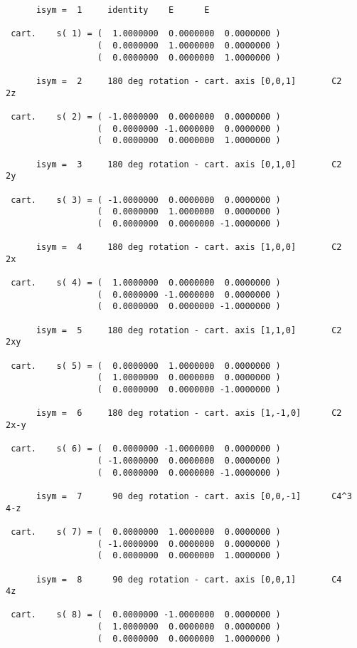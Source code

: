 \documentclass[12pt,a4paper]{article}
\begin{document}
\begin{footnotesize}
\begin{verbatim}
      isym =  1     identity    E      E

 cart.    s( 1) = (  1.0000000  0.0000000  0.0000000 )
                  (  0.0000000  1.0000000  0.0000000 )
                  (  0.0000000  0.0000000  1.0000000 )

      isym =  2     180 deg rotation - cart. axis [0,0,1]       C2    2z

 cart.    s( 2) = ( -1.0000000  0.0000000  0.0000000 )
                  (  0.0000000 -1.0000000  0.0000000 )
                  (  0.0000000  0.0000000  1.0000000 )

      isym =  3     180 deg rotation - cart. axis [0,1,0]       C2    2y

 cart.    s( 3) = ( -1.0000000  0.0000000  0.0000000 )
                  (  0.0000000  1.0000000  0.0000000 )
                  (  0.0000000  0.0000000 -1.0000000 )

      isym =  4     180 deg rotation - cart. axis [1,0,0]       C2    2x

 cart.    s( 4) = (  1.0000000  0.0000000  0.0000000 )
                  (  0.0000000 -1.0000000  0.0000000 )
                  (  0.0000000  0.0000000 -1.0000000 )

      isym =  5     180 deg rotation - cart. axis [1,1,0]       C2    2xy

 cart.    s( 5) = (  0.0000000  1.0000000  0.0000000 )
                  (  1.0000000  0.0000000  0.0000000 )
                  (  0.0000000  0.0000000 -1.0000000 )

      isym =  6     180 deg rotation - cart. axis [1,-1,0]      C2    2x-y

 cart.    s( 6) = (  0.0000000 -1.0000000  0.0000000 )
                  ( -1.0000000  0.0000000  0.0000000 )
                  (  0.0000000  0.0000000 -1.0000000 )

      isym =  7      90 deg rotation - cart. axis [0,0,-1]      C4^3  4-z

 cart.    s( 7) = (  0.0000000  1.0000000  0.0000000 )
                  ( -1.0000000  0.0000000  0.0000000 )
                  (  0.0000000  0.0000000  1.0000000 )

      isym =  8      90 deg rotation - cart. axis [0,0,1]       C4    4z

 cart.    s( 8) = (  0.0000000 -1.0000000  0.0000000 )
                  (  1.0000000  0.0000000  0.0000000 )
                  (  0.0000000  0.0000000  1.0000000 )


\end{verbatim}
\end{footnotesize}
\end{document}
